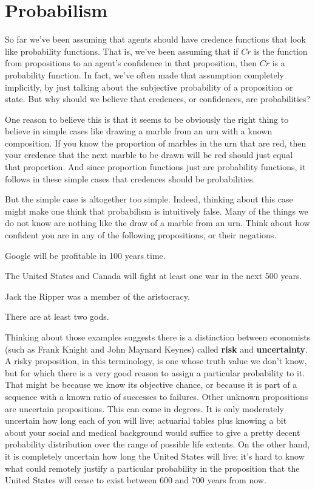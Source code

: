 \section{Probabilism}

So far we've been assuming that agents should have credence functions that look like probability functions. That is, we've been assuming that if $Cr$ is the function from propositions to an agent's confidence in that proposition, then $Cr$ is a probability function. In fact, we've often made that assumption completely implicitly, by just talking about the subjective probability of a proposition or state. But why should we believe that credences, or confidences, are probabilities?

One reason to believe this is that it seems to be obviously the right thing to believe in simple cases like drawing a marble from an urn with a known composition. If you know the proportion of marbles in the urn that are red, then your credence that the next marble to be drawn will be red should just equal that proportion. And since proportion functions just are probability functions, it follows in these simple cases that credences should be probabilities.

But the simple case is altogether too simple. Indeed, thinking about this case might make one think that probabilism is intuitively false. Many of the things we do not know are nothing like the draw of a marble from an urn. Think about how confident you are in any of the following propositions, or their negations.

\begin{enumerate*}
\item Google will be profitable in 100 years time.
\item The United States and Canada will fight at least one war in the next 500 years.
\item Jack the Ripper was a member of the aristocracy.
\item There are at least two gods.
\end{enumerate*}
Thinking about those examples suggests there is a distinction between economists (such as Frank Knight and John Maynard Keynes) called \textbf{risk} and \textbf{uncertainty}. A risky proposition, in this terminology, is one whose truth value we don't know, but for which there is a very good reason to assign a particular probability to it. That might be because we know its objective chance, or because it is part of a sequence with a known ratio of successes to failures. Other unknown propositions are uncertain propositions. This can come in degrees. It is only moderately uncertain how long each of you will live; actuarial tables plus knowing a bit about your social and medical background would suffice to give a pretty decent probability distribution over the range of possible life extents. On the other hand, it is completely uncertain how long the United States will live; it's hard to know what could remotely justify a particular probability in the proposition that the United States will cease to exist between 600 and 700 years from now.

